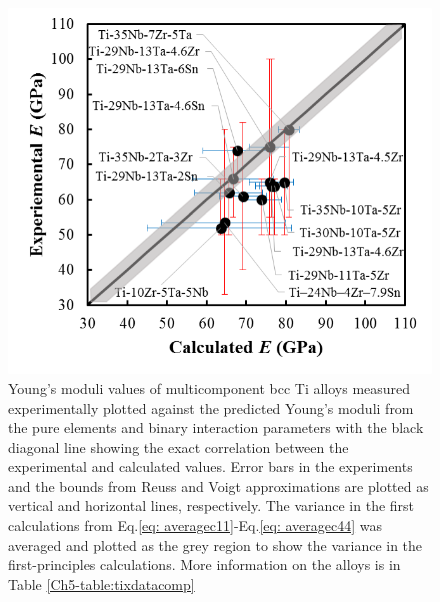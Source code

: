 \pagebreak
\begin{figure}[H]
	\centering
	\includegraphics{Chapter-5/Figures/edatabase.png}
	\caption{Young's moduli values of multicomponent bcc Ti alloys measured experimentally plotted against the predicted Young's moduli from the pure elements and binary interaction parameters with the black diagonal line showing the exact correlation between the experimental and calculated values. Error bars in the experiments and the bounds from Reuss and Voigt approximations are plotted as vertical and horizontal lines, respectively. The variance in the first calculations from Eq.\ref{eq: averagec11}-Eq.\ref{eq: averagec44} was averaged and plotted as the grey region to show the variance in the first-principles calculations. More information on the alloys is in Table \ref{Ch5-table:tixdatacomp} \cite{Tane2010a,Geetha2009,Mohammed2014}}
	\label{Ch5-figure:tixdatabase}
\end{figure}